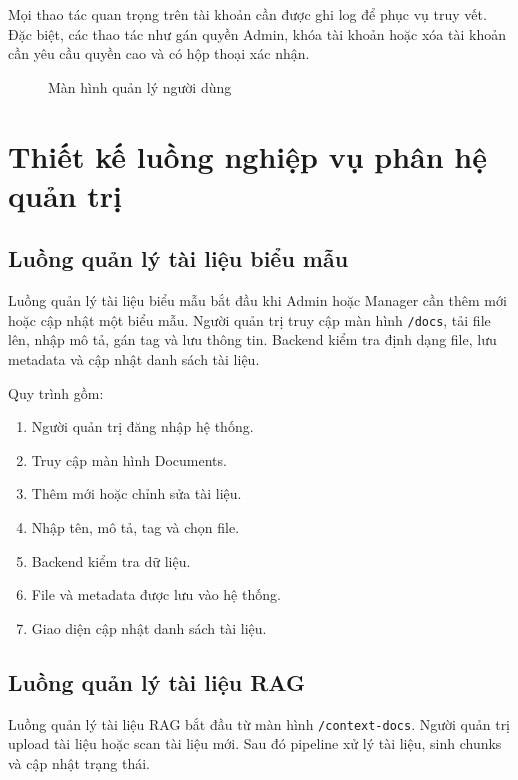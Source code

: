 \documentclass[12pt,a4paper]{report}
\begin{document}
Mọi thao tác quan trọng trên tài khoản cần được ghi log để phục vụ truy vết. Đặc biệt, các thao tác như gán quyền Admin, khóa tài khoản hoặc xóa tài khoản cần yêu cầu quyền cao và có hộp thoại xác nhận.

\begin{figure}[H]
    \centering
    \caption{Màn hình quản lý người dùng}
    \label{fig:users-management}
\end{figure}

\section{Thiết kế luồng nghiệp vụ phân hệ quản trị}

\subsection{Luồng quản lý tài liệu biểu mẫu}

Luồng quản lý tài liệu biểu mẫu bắt đầu khi Admin hoặc Manager cần thêm mới hoặc cập nhật một biểu mẫu. Người quản trị truy cập màn hình \texttt{/docs}, tải file lên, nhập mô tả, gán tag và lưu thông tin. Backend kiểm tra định dạng file, lưu metadata và cập nhật danh sách tài liệu.

Quy trình gồm:

\begin{enumerate}
    \item Người quản trị đăng nhập hệ thống.
    \item Truy cập màn hình Documents.
    \item Thêm mới hoặc chỉnh sửa tài liệu.
    \item Nhập tên, mô tả, tag và chọn file.
    \item Backend kiểm tra dữ liệu.
    \item File và metadata được lưu vào hệ thống.
    \item Giao diện cập nhật danh sách tài liệu.
\end{enumerate}

\subsection{Luồng quản lý tài liệu RAG}

Luồng quản lý tài liệu RAG bắt đầu từ màn hình \texttt{/context-docs}. Người quản trị upload tài liệu hoặc scan tài liệu mới. Sau đó pipeline xử lý tài liệu, sinh chunks và cập nhật trạng thái.
\end{document}
